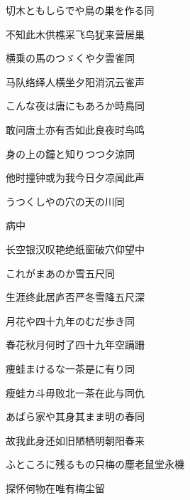 \begin{haiku}
    {\FH 切木ともしらでや鳥の巣を作る}\hfill{\FH 同}

    {\FK 不知此木供樵采飞鸟犹来营居巢}
\end{haiku}

\begin{haiku}
    {\FH 横乗の馬のつゞくや夕雲雀}\hfill{\FH 同}

    {\FK 马队络绎人横坐夕阳消沉云雀声}
\end{haiku}

\begin{haiku}
    {\FH こんな夜は唐にもあろか時鳥}\hfill{\FH 同}

    {\FK 敢问唐土亦有否如此良夜时鸟鸣}
\end{haiku}

\begin{haiku}
    {\FH 身の上の鐘と知りつつ夕涼}\hfill{\FH 同}

    {\FK 他时撞钟或为我今日夕凉闻此声}
\end{haiku}

\begin{haiku}
    {\FH うつくしやの穴の天の川}\hfill{\FH 同}

    {\FK 病中}

    {\FK 长空银汉叹艳绝纸窗破穴仰望中}
\end{haiku}

\begin{haiku}
    {\FH これがまあのか雪五尺}\hfill{\FH 同}

    {\FK 生涯终此居庐否严冬雪降五尺深}
\end{haiku}

\begin{haiku}
    {\FH 月花や四十九年のむだ歩き}\hfill{\FH 同}

    {\FK 春花秋月何时了四十九年空蹒跚}
\end{haiku}

\begin{haiku}
    {\FH 痩蛙まけるな一茶是に有り}\hfill{\FH 同}

    {\FK 瘦蛙カ斗毋败北一茶在此与同仇}
\end{haiku}

\begin{haiku}
    {\FH あばら家や其身其まま明の春}\hfill{\FH 同}

    {\FK 故我此身还如旧陋栖明朝阳春来}
\end{haiku}

\begin{haiku}
    {\FH ふところに残るもの只梅の塵}\hfill{\FH 老鼠堂永機}

    {\FK 探怀何物在唯有梅尘留}
\end{haiku}

